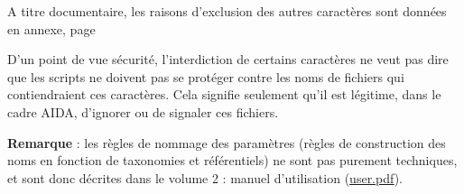 \medbreak
  A titre documentaire, les raisons d'exclusion des autres caractères sont
données en annexe, page \pageref{sec:exclu}

  D'un point de vue sécurité, l'interdiction de certains caractères ne veut
pas dire que les scripts ne doivent pas se protéger contre les noms de fichiers
qui contiendraient ces caractères. Cela signifie seulement qu'il est légitime,
dans le cadre AIDA, d'ignorer ou de signaler ces fichiers.

\textbf{Remarque} : les règles de nommage des paramètres (règles de
construction des noms en fonction de taxonomies et référentiels) ne sont pas
purement techniques, et sont donc décrites dans le volume 2 : manuel
d'utilisation (\url{user.pdf}).

